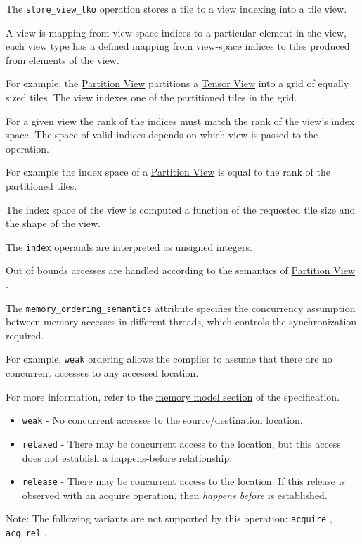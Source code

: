 \documentclass{article}
\begin{document}
The \texttt{store\_view\_tko} operation stores a tile to a view indexing into a tile view.


A view is mapping from view-space indices to a particular element in the view, each view type has a defined mapping from view-space indices to tiles produced from elements of the view.


For example, the \href{https://docs.nvidia.com/cuda/tile-ir/latest/sections/types.html#type-partition-view}{Partition View} partitions a \href{https://docs.nvidia.com/cuda/tile-ir/latest/sections/types.html#type-tensor-view}{Tensor View} into a grid of equally sized tiles. The view indexes one of the partitioned tiles in the grid.


For a given view the rank of the indices must match the rank of the view's index space. The space of valid indices depends on which view is passed to the operation.

For example the index space of a \href{https://docs.nvidia.com/cuda/tile-ir/latest/sections/types.html#type-partition-view}{Partition View} is equal to the rank of the partitioned tiles.


The index space of the view is computed a function of the requested tile size and the shape of the view.


The \texttt{index} operands are interpreted as unsigned integers.


Out of bounds accesses are handled according to the semantics of \href{https://docs.nvidia.com/cuda/tile-ir/latest/sections/types.html#type-partition-view}{Partition View} .


The \texttt{memory\_ordering\_semantics} attribute specifies the concurrency assumption between memory accesses in different threads, which controls the synchronization required.

For example, \texttt{weak} ordering allows the compiler to assume that there are no concurrent accesses to any accessed location.

For more information, refer to the \href{https://docs.nvidia.com/cuda/tile-ir/latest/sections/memory_model.html#section-memory-model}{memory model section} of the specification.


\begin{itemize}
\item \texttt{weak} - No concurrent accesses to the source/destination location.
\item \texttt{relaxed} - There may be concurrent access to the location, but this access does not establish a happens-before relationship.
\item \texttt{release} - There may be concurrent access to the location. If this release is observed with an acquire operation, then \textit{happens before} is established.

\end{itemize}
Note: The following variants are not supported by this operation: \texttt{acquire} , \texttt{acq\_rel} .
\end{document}

